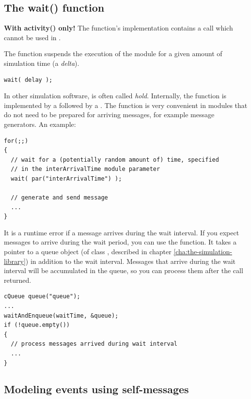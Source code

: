 \subsection{The wait() function}

\textbf{With activity() only!} The  function's implementation
contains a  call which cannot be used in .

The  function suspends the execution of the module for
a given amount of simulation time (a \textit{delta}).

\begin{verbatim}
wait( delay );
\end{verbatim}

In other simulation software,  is often called \textit{hold}.
Internally, the  function is implemented by a
 followed by a .
The  function is very convenient in modules that do not need
to be prepared for arriving messages, for example message generators.
An example:

\begin{verbatim}
for(;;)
{
  // wait for a (potentially random amount of) time, specified
  // in the interArrivalTime module parameter
  wait( par("interArrivalTime") );

  // generate and send message
  ...
}
\end{verbatim}

It is a runtime error if a message arrives during the wait interval.
If you expect messages to arrive during the wait period, you can
use the  function. It takes a pointer to a queue object
(of class , described in chapter \ref{cha:the-simulation-library})
in addition to the wait interval. Messages that arrive during the
wait interval will be accumulated in the queue, so you can
process them after the  call returned.

\begin{verbatim}
cQueue queue("queue");
...
waitAndEnqueue(waitTime, &queue);
if (!queue.empty())
{
  // process messages arrived during wait interval
  ...
}
\end{verbatim}


\subsection{Modeling events using self-messages}
\label{sec:ch-simple-modules:self-messages}

